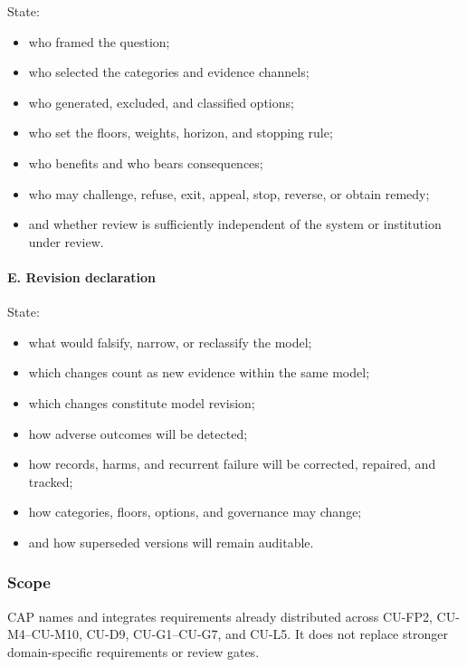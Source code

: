 \documentclass[
  11pt,
]{article}
\providecommand{\tightlist}{%
  \setlength{\itemsep}{0pt}\setlength{\parskip}{0pt}}
\begin{document}
State:

\begin{itemize}
\tightlist
\item
  who framed the question;
\item
  who selected the categories and evidence channels;
\item
  who generated, excluded, and classified options;
\item
  who set the floors, weights, horizon, and stopping rule;
\item
  who benefits and who bears consequences;
\item
  who may challenge, refuse, exit, appeal, stop, reverse, or obtain
  remedy;
\item
  and whether review is sufficiently independent of the system or
  institution under review.
\end{itemize}

\paragraph{E. Revision declaration}\label{e.-revision-declaration}

State:

\begin{itemize}
\tightlist
\item
  what would falsify, narrow, or reclassify the model;
\item
  which changes count as new evidence within the same model;
\item
  which changes constitute model revision;
\item
  how adverse outcomes will be detected;
\item
  how records, harms, and recurrent failure will be corrected, repaired,
  and tracked;
\item
  how categories, floors, options, and governance may change;
\item
  and how superseded versions will remain auditable.
\end{itemize}

\subsubsection{Scope}\label{scope-9}

CAP names and integrates requirements already distributed across CU-FP2,
CU-M4--CU-M10, CU-D9, CU-G1--CU-G7, and CU-L5. It does not replace
stronger domain-specific requirements or review gates.
\end{document}
